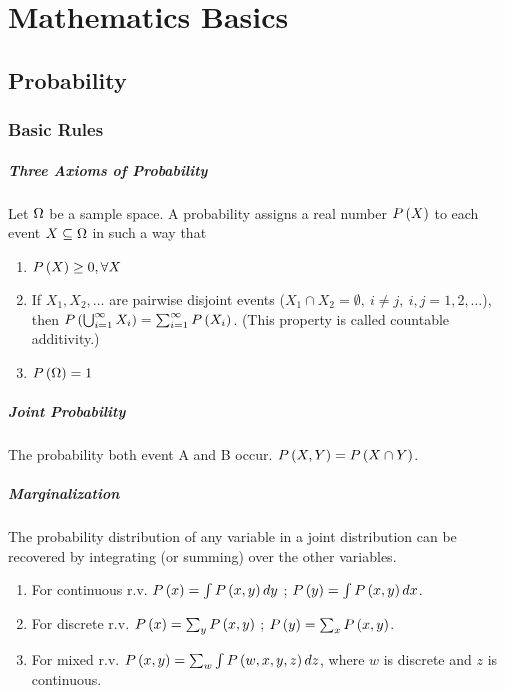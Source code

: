 
\chapter{Mathematics Basics}
\label{chapter2}



\section{Probability}
\label{section2.1}

\subsection{Basic Rules}

\paragraph{Three Axioms of Probability}

Let $\Om$ be a sample space. A probability assigns a real number $\P{X}$ to each event $X \subseteq \Om$ in such a way that
\begin{enumerate}
	\item $\P{X} \geq 0, \forall X$
	\item If $X_1, X_2, \dotsc$ are pairwise disjoint events ($X_1 \cap X_2=\emptyset,\ i \ne j,\ i,j=1,2,\dotsc$), then $\P{\bigcup_{i=1}^{\infty}X_i}=\sum_{i=1}^{\infty}\P{X_i}$. (This property is called countable additivity.)
	\item $\P{\Om}=1$
\end{enumerate}

\paragraph{Joint Probability}

The probability both event A and B occur. $\P{X,Y}=\P{X \cap Y}$.

\paragraph{Marginalization}

The probability distribution of any variable in a joint distribution can be recovered by integrating (or summing) over the other variables.
\begin{enumerate}
	\item For continuous r.v. $\P{x}=\int\P{x,y}dy$ ; $\P{y}=\int\P{x,y}dx$.
	\item For discrete r.v. $\P{x}=\sum_y\P{x,y}$ ; $\P{y}=\sum_x\P{x,y}$.
	\item For mixed r.v. $\P{x,y}=\sum_w\int\P{w,x,y,z}dz$, where $w$ is discrete and $z$ is continuous.
\end{enumerate}

